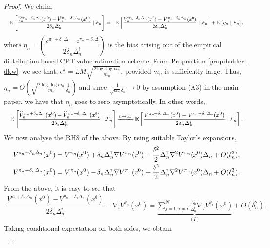 \begin{proof}
We claim
\begin{align}
\quad\mathbb{E}\left[\dfrac{\widehat V_n^{\pi_n + \delta_n \Delta_n}(x^0) -\widehat V_n^{\pi_n - \delta_n \Delta_n}(x^0)}{2 \delta_n \Delta_n^{i}} \left.\right| \mathcal{F}_n\right] 
= \quad&\mathbb{E}\left[\dfrac{V_n^{\pi_n + \delta_n \Delta_n}(x^0) -V_n^{\pi_n - \delta_n \Delta_n}(x^0)}{2 \delta_n \Delta_n^{i}} \left.\right| \mathcal{F}_n\right] + \mathbb{E}\left[ \eta_n \mid \mathcal{F}_n\right],
\end{align}
where $\eta_n = \left(\dfrac{\epsilon^{\pi_n +\delta_n\Delta} - \epsilon^{\pi_n-\delta_n\Delta}}{2\delta_n\Delta_n^{i}}\right)$
 is the bias arising out of the empirical distribution based CPT-value estimation scheme.
From Proposition \ref{prop:holder-dkw}, we see that, $\epsilon^\pi = LM\sqrt{\frac{2 \log \log m_n}{m_n}}$, provided $m_n$ is sufficiently large.
Thus, $\eta_n = O\left( \sqrt{\frac{2 \log \log m_n}{m_n}} \frac{1}{\delta_n}\right)$ and since $\frac{1}{\sqrt{m_n} \delta_n} \rightarrow 0$ by assumption (A3) in the main paper, we have that
$\eta_n$ goes to zero asymptotically. In other words,
\begin{align}
\quad\mathbb{E}\left[\dfrac{\widehat V_n^{\pi_n + \delta_n \Delta_n}(x^0) -\widehat V_n^{\pi_n - \delta_n \Delta_n}(x^0)}{2 \delta_n \Delta_n^{i}} \left.\right| \mathcal{F}_n\right] 
&\xrightarrow{n\rightarrow\infty}  \mathbb{E}\left[\dfrac{V^{\pi_n + \delta_n \Delta_n}(x^0) -V^{\pi_n - \delta_n \Delta_n}(x^0)}{2 \delta_n \Delta_n^{i}} \left.\right| \mathcal{F}_n\right].  \label{eq:l1}
\end{align}
We now analyse the RHS of the above.
By using suitable Taylor's expansions,
\begin{align*}
V^{\pi_n + \delta_n \Delta_n}(x^0) = V^{\pi_n}(x^0) + \delta_n \Delta_n^\mathsf{\scriptscriptstyle T} \nabla V^{\pi_n}(x^0) + \frac{\delta^2}{2} \Delta_n^\mathsf{\scriptscriptstyle T} \nabla^2 V^{\pi_n}(x^0)\Delta_n + O(\delta_n^3), \\
V^{\pi_n - \delta_n \Delta_n}(x^0) = V^{\pi_n}(x^0) - \delta_n \Delta_n^\mathsf{\scriptscriptstyle T} \nabla V^{\pi_n}(x^0) + \frac{\delta^2}{2} \Delta_n^\mathsf{\scriptscriptstyle T} \nabla^2 V^{\pi_n}(x^0)\Delta_n + O(\delta_n^3).\end{align*}
From the above, it is easy to see that 
\begin{align*}
\dfrac{V^{\theta_n + \delta_n \Delta_n}(x^0) - V^{\theta_n - \delta_n \Delta_n}(x^0)}{2 \delta_n \Delta_n^i}
- \nabla_i V^{\theta_n}(x^0)
=\underbrace{\sum_{j=1,j\not=i}^{N} \frac{\Delta_n^j}{\Delta_n^i}\nabla_j V^{\theta_n}(x^0)}_{(I)} + O(\delta_n^2).
\end{align*}
Taking conditional expectation on both sides, we obtain
\begin{align}

\end{align}
\end{proof}
